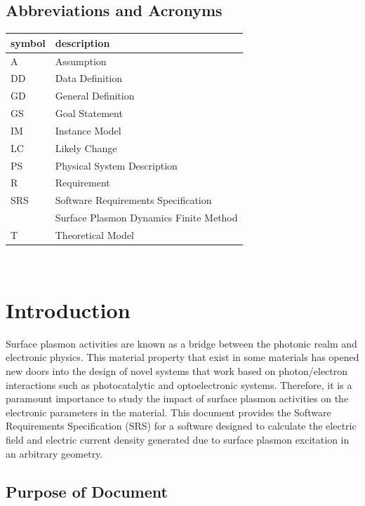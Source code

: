 \documentclass[12pt]{article}
\begin{document}
	
	\subsection{Abbreviations and Acronyms}
	
	\renewcommand{\arraystretch}{1.2} \begin{tabular}{l l} \toprule \textbf{symbol}
		& \textbf{description}\\ \midrule A & Assumption\\ DD & Data Definition\\ GD &
		General Definition\\ GS & Goal Statement\\ IM & Instance Model\\ LC & Likely
		Change\\ PS & Physical System Description\\ R & Requirement\\ SRS & Software
		Requirements Specification\\ \progname{} & Surface Plasmon Dynamics Finite
		Method\\ T & Theoretical Model\\ \bottomrule \end{tabular}\\
	
	
	\newpage
	
	
	\section{Introduction}
	
	Surface plasmon activities are known as a bridge between the photonic realm and
	electronic physics. This material property that exist in some materials has
	opened new doors into the design of novel systems that work based on
	photon/electron interactions such as photocatalytic and optoelectronic systems.
	Therefore, it is a paramount importance to study the impact of surface plasmon
	activities on the electronic parameters in the material. This document provides
	the Software Requirements Specification (SRS) for a software designed to
	calculate the electric field and electric current density generated due to
	surface plasmon excitation in an arbitrary geometry.
	
	
	\subsection{Purpose of Document}
	
\end{document}
